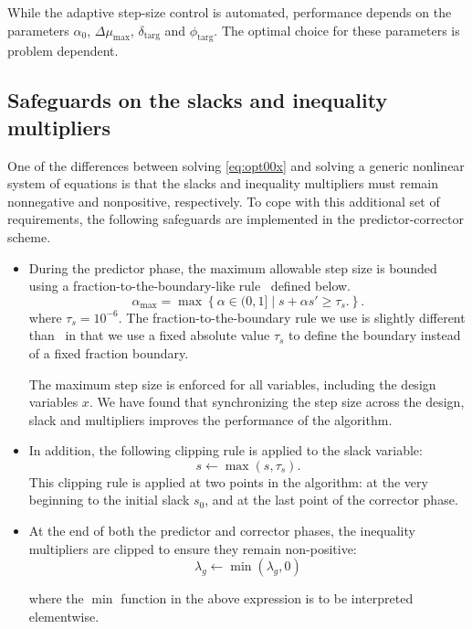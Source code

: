 \begin{remark}
  While the adaptive step-size control is automated, performance depends on the
  parameters $\alpha_0$, $\Delta \mu_{\max}$, $\delta_{\text{targ}}$ and
  $\phi_{\text{targ}}$.  The optimal choice for these parameters is problem
  dependent.
\end{remark}

\subsection{Safeguards on the slacks and inequality multipliers}\label{sec:fraction}
One of the differences between solving \eqref{eq:opt00x} and solving a generic
nonlinear system of equations is that the slacks and inequality multipliers must
remain nonnegative and nonpositive, respectively.  To cope with this additional
set of requirements, the following safeguards are implemented in the
predictor-corrector scheme.
\begin{itemize}
  \item During the predictor phase, the maximum allowable step size is bounded
    using a fraction-to-the-boundary-like rule~\cite{Nocedal2006NO} defined
    below.
  \begin{equation}\label{eq:f2b}
      \alpha_{\max} = \max\left\{
      \alpha \in (0,1] \;|\; s + \alpha s' \geq \tau_s .\right\}.
    \end{equation}
where $\tau_s = 10^{-6}$. The fraction-to-the-boundary rule we use is slightly 
different than~\cite{Nocedal2006NO} in that we use a fixed absolute value $\tau_s$ to define the boundary instead of a fixed fraction boundary. 

    The maximum step size is enforced for all variables, including the design
    variables $x$.  We have found that synchronizing the step size across the
    design, slack and multipliers improves the performance of the algorithm.

\item In addition, the following clipping rule is applied to the slack variable: 
\begin{equation}\label{eq:sclip}
    s \leftarrow \max(s, \tau_s).
\end{equation}
This clipping rule is applied at two points in the algorithm: at the very beginning to the initial 
slack $s_0$, and at the last point of the corrector phase. 

    
  \item At the end of both the predictor and corrector phases, 
    the inequality multipliers are clipped to
    ensure they remain non-positive:
    \begin{equation}\label{eq:lclip}
     \lambda_g \leftarrow \min(\lambda_g, 0)
    \end{equation}

    where the $\min$ function in the above expression is to be
    interpreted elementwise.  
\end{itemize}

